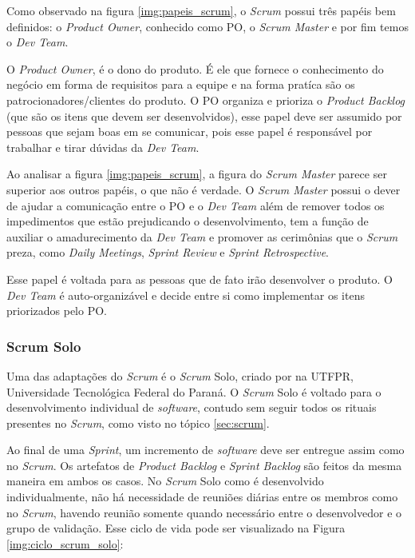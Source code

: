 Como observado na figura \ref{img:papeis_scrum}, o \textit{Scrum} possui três papéis bem definidos: o \textit{Product Owner}, conhecido como PO, o \textit{Scrum Master} e por fim temos o \textit{Dev Team}. 


O \textit{Product Owner}, é o dono do produto. É ele que fornece o conhecimento do negócio em forma de requisitos para a equipe e na forma pratíca são os patrocionadores/clientes do produto. O PO organiza e prioriza o \textit{Product Backlog} (que são os itens que devem ser desenvolvidos), esse papel deve ser assumido por pessoas que sejam boas em se comunicar, pois esse papel é responsável por trabalhar e tirar dúvidas da \textit{Dev Team}.


Ao analisar a figura \ref{img:papeis_scrum}, a figura do \textit{Scrum Master} parece ser superior aos outros papéis, o que não é verdade. O \textit{Scrum Master} possui o dever de ajudar a comunicação entre o PO e o \textit{Dev Team} além de remover todos os impedimentos que estão prejudicando o desenvolvimento, tem a função de auxiliar o amadurecimento da \textit{Dev Team} e promover as cerimônias que o \textit{Scrum} preza, como \textit{Daily Meetings}, \textit{Sprint Review} e \textit{Sprint Retrospective}.


Esse papel é voltada para as pessoas que de fato irão desenvolver o produto. O \textit{Dev Team} é auto-organizável e decide entre si como implementar os itens priorizados pelo PO.

\subsubsection{Scrum Solo}

Uma das adaptações do \textit{Scrum} é o \textit{Scrum} Solo, criado por  na UTFPR, Universidade Tecnológica Federal do Paraná. O \textit{Scrum} Solo é voltado para o desenvolvimento individual de \textit{software}, contudo sem seguir todos os rituais presentes no \textit{Scrum}, como visto no tópico \ref{sec:scrum}.

Ao final de uma \textit{Sprint}, um incremento de \textit{software} deve ser entregue assim como no \textit{Scrum}. Os artefatos de \textit{Product Backlog} e \textit{Sprint Backlog} são feitos da mesma maneira em ambos os casos. No \textit{Scrum} Solo como é desenvolvido individualmente, não há necessidade de reuniões diárias entre os membros como no \textit{Scrum}, havendo reunião somente quando necessário entre o desenvolvedor e o grupo de validação. Esse ciclo de vida pode ser visualizado na Figura \ref{img:ciclo_scrum_solo}:

